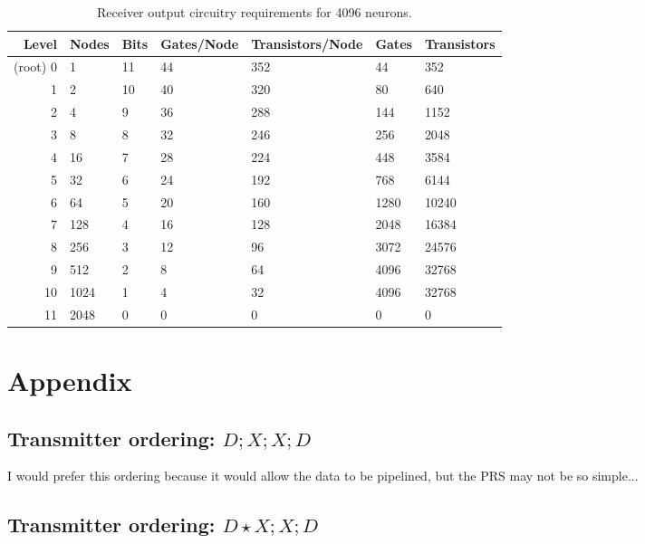 \documentclass{article}
\begin{document}
\begin{table}
  \centering
  \begin{tabular}{|r|l|l|l|l|l|l|}
  \hline
  Level & Nodes & Bits & Gates/Node & Transistors/Node & Gates & Transistors \\
  \hline
  (root) 0 & 1 & 11 & 44 & 352 & 44 & 352 \\
  \hline
  1 & 2 & 10 & 40 & 320 & 80 & 640 \\
  \hline
  2 & 4 & 9 & 36 & 288 & 144 & 1152 \\
  \hline
  3 & 8 & 8 & 32 & 246 & 256 & 2048 \\
  \hline
  4 & 16 & 7 & 28 & 224 & 448 & 3584 \\
  \hline
  5 & 32 & 6 & 24 & 192 & 768 & 6144 \\
  \hline
  6 & 64 & 5 & 20 & 160 & 1280 & 10240 \\
  \hline
  7 & 128 & 4 & 16 & 128 & 2048 & 16384 \\
  \hline
  8 & 256 & 3 & 12 & 96 & 3072 & 24576 \\
  \hline
  9 & 512 & 2 & 8 & 64 & 4096 & 32768 \\
  \hline
  10 & 1024 & 1 & 4 & 32 & 4096 & 32768 \\
  \hline
  11 & 2048 & 0 & 0 & 0 & 0 & 0 \\
  \hline
  \end{tabular}
  \caption{\label{tab:recv} Receiver output circuitry requirements for 4096 neurons.}
\end{table}

\section{Appendix}

\subsection{Transmitter ordering: $D;X;X;D$}

I would prefer this ordering because it would allow the data to be pipelined, but the PRS may not be so simple...

\subsection{Transmitter ordering: $D\!\star\!X;X;D$}
\end{document}
